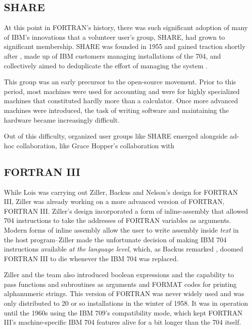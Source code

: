 \subsection{SHARE}
\label{subsec:share}

At this point in FORTRAN's history, there was such significant adoption of
many of IBM's innovations that a volunteer user's group, SHARE, had grown to
significant membership.
SHARE was founded in 1955 and gained traction shortly after \cite{akera_voluntarism_ibm_share_2001},
made up of IBM customers managing installations of the 704,
and collectively aimed to deduplicate the effort of managing the system
\cite{armer_share_eulogy_1980}.

This group was an early precursor to the open-source movement.
Prior to this period, most machines were used for accounting and were for
highly specialized machines that constituted hardly more than a calculator.
Once more advanced machines were introduced, the task of writing software
and maintaining the hardware became increasingly difficult.

Out of this difficulty, organized user groups like SHARE emerged alongside
ad-hoc collaboration, like Grace Hopper's collaboration with

\subsection{FORTRAN III}

While Lois was carrying out Ziller, Backus and Nelson's design for FORTRAN III,
Ziller was already working on a more advanced version of FORTRAN, FORTRAN III.
Ziller's design incorporated a form of \gls{inline-assembly} that allowed
704 instructions to take the addresses of FORTRAN variables as arguments.
Modern forms of inline assembly allow the user to write assembly inside \textit{text}
in the host program--Ziller made the unfortunate decision of making IBM 704
instructions available \textit{at the language level}, which, as Backus remarked
\cite{hopl_backus_history_of_fortran}, doomed FORTRAN III to die whenever the IBM 704
was replaced.

Ziller and the team also introduced boolean expressions and the capability to
pass functions and subroutines as arguments and FORMAT codes for printing
alphanumeric strings.
This version of FORTRAN was never widely used and was only distributed to
20 or so installations in the winter of 1958.
It was in operation until the 1960s using the IBM 709's compatibility mode,
which kept FORTRAN III's machine-specific IBM 704 features alive for a bit longer
than the 704 itself.

